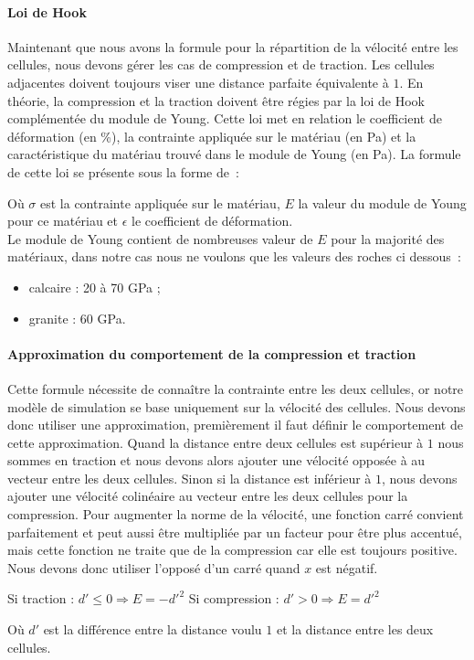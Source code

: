 \documentclass[a4paper,11pt]{article}
\begin{document}
\paragraph{Loi de Hook}
\medbreak
Maintenant que nous avons la formule pour la répartition de la vélocité entre les cellules, nous devons gérer les cas de compression et de traction.
Les cellules adjacentes doivent toujours viser une distance parfaite équivalente à $1$.
En théorie, la compression et la traction doivent être régies par la loi de Hook complémentée du module de Young. Cette loi met en relation le coefficient de déformation (en \%), la contrainte appliquée sur le matériau (en Pa) et la caractéristique du matériau trouvé dans le module de Young (en Pa).
La formule de cette loi se présente sous la forme de~:
\begin{center}
\end{center}
Où $\sigma$ est la contrainte appliquée sur le matériau, $E$ la valeur du module de Young pour ce matériau et $\epsilon$ le coefficient de déformation. \\
Le module de Young contient de nombreuses valeur de $E$ pour la majorité des matériaux, dans notre cas nous ne voulons que les valeurs des roches ci dessous~:
\begin{itemize}
  \item calcaire : 20 à 70 GPa ;
  \item granite : 60 GPa.
\end{itemize}


\paragraph{Approximation du comportement de la compression et traction}
\medbreak
Cette formule nécessite de connaître la contrainte entre les deux cellules, or notre modèle de simulation se base uniquement sur la vélocité des cellules.
Nous devons donc utiliser une approximation, premièrement il faut définir le comportement de cette approximation.
Quand la distance entre deux cellules est supérieur à $1$ nous sommes en traction et nous devons alors ajouter une vélocité opposée à au vecteur entre les deux cellules.
Sinon si la distance est inférieur à $1$, nous devons ajouter une vélocité colinéaire au vecteur entre les deux cellules pour la compression.
Pour augmenter la norme de la vélocité, une fonction carré convient parfaitement et peut aussi être multipliée par un facteur pour être plus accentué, mais cette fonction ne traite que de la compression car elle est toujours positive.
Nous devons donc utiliser l'opposé d'un carré quand $x$ est négatif.
\medbreak
\begin{center}
  Si traction : $d' \leqslant 0 \Rightarrow E = -d'^2$ \medbreak
  Si compression : $d' > 0 \Rightarrow E = d'^2$
\end{center}
Où $d'$ est la différence entre la distance voulu $1$ et la distance entre les deux cellules. \\
\end{document}
